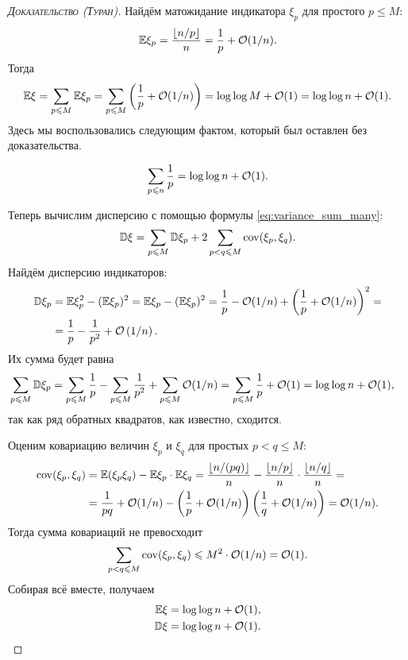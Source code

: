 \documentclass[../main.tex]{subfiles}
\begin{document}
\begin{proof}[\normalfont\textsc{Доказательство (Туран)}]
Найдём матожидание индикатора $ \xi_p $ для простого $ p \leqslant M$:
 \begin{align*}
  \mathbb E\xi_p = \frac{\left\lfloor n / p \right\rfloor }{n} = \frac{1}{p} + \mathcal{O}(1 / n).
 \end{align*} Тогда
 \begin{align*}
  \mathbb E\xi = \sum_{p \leqslant M} \mathbb E\xi_p = \sum_{p \leqslant M}\left(\frac{1}{p} + \mathcal{O} ( 1/n ) \right) = \log\log M + \mathcal{O}(1) = \log\log n + \mathcal{O}(1).
 \end{align*} Здесь мы воспользовались следующим фактом, который был оставлен без доказательства.
 \begin{lm}
  \begin{align*}
   \sum_{\substack{p \leqslant n}} \frac{1}{p} = \log\log n + \mathcal{O}(1).
  \end{align*}
 \end{lm}

 Теперь вычислим дисперсию с помощью формулы \eqref{eq:variance_sum_many}:
 \begin{align*}
  \mathbb D\xi = \sum_{p \leqslant M} \mathbb D\xi_p + 2 \sum_{p < q \leqslant M} \mathrm{cov}(\xi_p,\xi_q).
 \end{align*}
 Найдём дисперсию индикаторов:
 \begin{align*}
  \mathbb D\xi_p &= \mathbb E\xi_p^{2} - (\mathbb E\xi_p)^{2} = \mathbb E\xi_p - (\mathbb E\xi_p)^{2} = \frac{1}{p} - \mathcal{O}( 1 / n) + \left( \frac{1}{p} + \mathcal{O}(1 / n) \right)^{2} = \\
  &= \frac{1}{p} - \frac{1}{p^{2}} + \mathcal{O} \left( 1 / n \right).
 \end{align*} Их сумма будет равна
 \begin{align*}
  \sum_{p \leqslant M}\mathbb D\xi_p &= \sum_{p \leqslant M} \frac{1}{p} - \sum_{p \leqslant M} \frac{1}{p^{2}} + \sum_{p \leqslant M} \mathcal{O}(1 / n) = \sum_{p \leqslant M} \frac{1}{p} + \mathcal{O}(1) = \log\log n + \mathcal{O}(1),
 \end{align*} так как ряд обратных квадратов, как известно, сходится.

 Оценим ковариацию величин $ \xi_p $ и $ \xi_q $ для простых $ p < q \leqslant M $:
 \begin{align*}
  \mathrm{cov}(\xi_p,\xi_q) &= \mathbb E(\xi_p\xi_q) - \mathbb E\xi_p \cdot \mathbb E\xi_q = \frac{\left\lfloor n / (pq) \right\rfloor }{n} - \frac{\left\lfloor n / p \right\rfloor }{n} \cdot \frac{\left\lfloor n / q \right\rfloor }{n} = \\
  &= \frac{1}{pq} + \mathcal{O}(1 / n) - \left(\frac{1}{p} + \mathcal{O}(1 / n)\right) \left(\frac{1}{q} + \mathcal{O}(1 / n)\right) = \mathcal{O}(1 / n).
 \end{align*} Тогда сумма ковариаций не превосходит
 \begin{align*}
  \sum_{p < q \leqslant M} \mathrm{cov}(\xi_p,\xi_q) \leqslant M^{2} \cdot \mathcal{O}(1 / n) = \mathcal{O}(1).
 \end{align*} Собирая всё вместе, получаем
 \begin{align}
  \label{eq:hardy_ramanujan_E_xi} \mathbb E\xi = \log\log n + \mathcal{O}(1), \\
  \label{eq:hardy_ramanujan_D_xi} \mathbb D\xi = \log\log n + \mathcal{O}(1).
 \end{align}


\end{proof}
\end{document}
